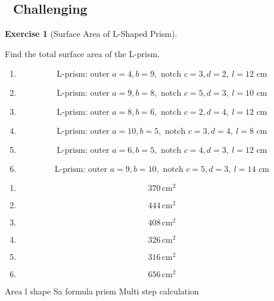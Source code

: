 \documentclass[
  letterpaper,
  DIV=11,
  numbers=noendperiod]{scrreprt}
\theoremstyle{definition}
\newtheorem{exercise}{Exercise}[chapter]
\theoremstyle{remark}
\begin{document}
\subsection{🔴 Challenging}

\begin{exercise}[Surface Area of L-Shaped
Prism]\protect\hypertarget{exr-sa-5}{}\label{exr-sa-5}

Find the total surface area of the L-prism.

\begin{enumerate}
\def\labelenumi{\alph{enumi})}
\item
  \[\text{L-prism: outer }a=4,b=9,\text{ notch }c=3,d=2,\ l=12\text{ cm}\]
\item
  \[\text{L-prism: outer }a=9,b=8,\text{ notch }c=5,d=3,\ l=10\text{ cm}\]
\item
  \[\text{L-prism: outer }a=8,b=6,\text{ notch }c=2,d=4,\ l=12\text{ cm}\]
\item
  \[\text{L-prism: outer }a=10,b=5,\text{ notch }c=3,d=4,\ l=8\text{ cm}\]
\item
  \[\text{L-prism: outer }a=6,b=5,\text{ notch }c=4,d=3,\ l=12\text{ cm}\]
\item
  \[\text{L-prism: outer }a=9,b=10,\text{ notch }c=5,d=3,\ l=14\text{ cm}\]
\end{enumerate}

\begin{tcolorbox}[enhanced jigsaw, opacitybacktitle=0.6, coltitle=black, arc=.35mm, colframe=quarto-callout-tip-color-frame, colback=white, bottomrule=.15mm, left=2mm, colbacktitle=quarto-callout-tip-color!10!white, titlerule=0mm, opacityback=0, title=\textcolor{quarto-callout-tip-color}{\faLightbulb}\hspace{0.5em}{🔍 View Solution}, leftrule=.75mm, breakable, rightrule=.15mm, bottomtitle=1mm, toptitle=1mm, toprule=.15mm]

\begin{enumerate}
\def\labelenumi{\alph{enumi})}
\item
  \[370\,\text{cm}^{2}\]
\item
  \[444\,\text{cm}^{2}\]
\item
  \[408\,\text{cm}^{2}\]
\item
  \[326\,\text{cm}^{2}\]
\item
  \[316\,\text{cm}^{2}\]
\item
  \[656\,\text{cm}^{2}\]
\end{enumerate}

\end{tcolorbox}

{Area l shape} {Sa formula prism} {Multi step calculation}

\end{exercise}
\end{document}
